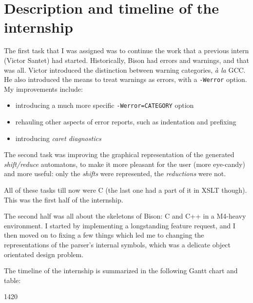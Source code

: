 \documentclass[a4paper,11pt,final]{article}
\begin{document}
  \section*{Description and timeline of the internship}

  The first task that I was assigned was to continue the work that a previous
  intern (Victor Santet) had started. Historically, Bison had errors and
  warnings, and that was all. Victor introduced the distinction between
  warning categories, \textit{à la} GCC\@. He also introduced the means to treat
  warnings as errors, with a \texttt{-Werror} option. My improvements include:
  \begin{itemize}
    \item introducing a much more specific \texttt{-Werror=CATEGORY} option
    \item rehauling other aspects of error reports, such as indentation and
      prefixing
    \item introducing \textit{caret diagnostics}
  \end{itemize}

  The second task was improving the graphical representation of the generated
  \textit{shift/reduce} automatons, to make it more pleasant for the user (more
  eye-candy) and more useful: only the \textit{shifts} were represented, the
  \textit{reductions} were not.

  All of these tasks till now were C (the last one had a part of it in XSLT
  though). This was the first half of the internship.

  The second half was all about the skeletons of Bison: C and C++ in a M4-heavy
  environment. I started by implementing a longstanding feature request, and I
  then moved on to fixing a few things which led me to changing the
  representations of the parser's internal symbols, which was a delicate object
  orientated design problem.

  The timeline of the internship is summarized in the following Gantt chart and
  table:

  \begin{adjustwidth}{-4cm}{-2cm}
  \begin{gantt}[xunitlength=0.7cm,fontsize=\small,titlefontsize=\small,drawledgerline=true]{14}{20}
    \begin{ganttitle}
    \end{ganttitle}
    \begin{ganttitle}
    \end{ganttitle}
    \begin{ganttitle}
    \end{ganttitle}
  \end{gantt}
  \end{adjustwidth}
\end{document}
